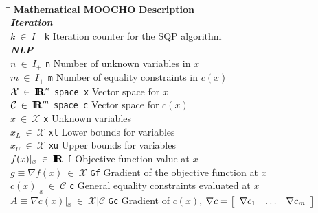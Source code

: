 {\noindent{}\\[2ex]

\pagebreak


\begin{tabbing}
\hspace*{25ex}\=\hspace{18ex}\= \kill
\underline{\textbf{Mathematical}}
	\> \underline{\textbf{MOOCHO}}
		\> \underline{\textbf{Description}}	\\
\textbf{\textit{Iteration}} \\
$k \:\in\:I_{+}$
	\> \texttt{k}
		\> Iteration counter for the SQP algorithm \\
\textbf{\textit{NLP}} \\
$n \:\in\:I_{+}$
	\> \texttt{n}
		\> Number of unknown variables in $x$ \\
$m \:\in\:I_{+}$
	\> \texttt{m}
		\> Number of equality constraints in $c(x)$ \\
$\mathcal{X} \:\in\:\RE^n$
	\> \texttt{space\_x}
		\> Vector space for $x$ \\
$\mathcal{C} \:\in\:\RE^m$
	\> \texttt{space\_c}
		\> Vector space for $c(x)$ \\
$x \:\in\:\mathcal{X}$
	\> \texttt{x}
		\> Unknown variables \\
$x_L \:\in\:\mathcal{X}$
	\> \texttt{xl}
		\> Lower bounds for variables \\
$x_U \:\in\:\mathcal{X}$
	\> \texttt{xu}
		\> Upper bounds for variables \\
$f(x)|_x \:\in\: \RE$
	\> \texttt{f}
		\> Objective function value at $x$ \\
$g \equiv \nabla f(x) \:\in\:\mathcal{X}$
	\> \texttt{Gf}
		\> Gradient of the objective function at $x$ \\
$c(x)|_x \:\in\:\mathcal{C}$
	\> \texttt{c}
		\> General equality constraints evaluated at $x$ \\
$A \equiv \nabla c(x)|_x \:\in\:\mathcal{X}|\mathcal{C}$
	\> \texttt{Gc}
		\> Gradient of $c(x)$,
			 $\nabla c = {\bmat{ccc} \nabla c_1 & \ldots & \nabla c_m \emat}$ \\


\end{tabbing}}

